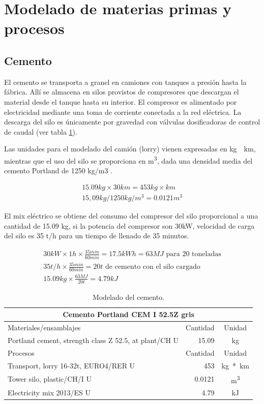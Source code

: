 \section{Modelado de materias primas y procesos}\label{sec:modeladoprocesos}
\subsection{Cemento}
El cemento se transporta a granel en camiones con tanques a presión hasta la fábrica. Allí se almacena en silos provistos de compresores que descargan el material desde el tanque hasta su interior. El compresor es alimentado por electricidad mediante una toma de corriente conectada a la red eléctrica. La descarga del silo es únicamente por gravedad con válvulas dosificadoras de control de caudal (ver tabla \ref{modeladodelcemento}).

Las unidades para el modelado del camión (lorry) vienen expresadas en \si{kg\times km}, mientras que el uso del silo se proporciona en \si{m^3}, dada una densidad media del cemento Portland de 1250 \si{kg/m3} \cite{website:ecoinvent}.

\begin{gather}
15.09 kg \times 30 km = 453 kg\times km\\
15,09 kg / 1250 kg/m^3 = 0.0121 m^3
\end{gather}

El mix eléctrico se obtiene del consumo del compresor del silo proporcional a una cantidad de 15.09 \si{kg}, si la potencia del compresor son 30kW, velocidad de carga del silo es 35 \si{\tonne/h} para un tiempo de llenado de 35 minutos.

\begin{gather}
30 kW \times 1 h \times \frac{35 min}{60 min} = 17.5 kWh = 63 MJ \text{ para 20 toneladas}\\
35 t/h \times \frac{35 min}{60 min} = 20 t \text{ de cemento con el silo cargado}\\
15.09 kg \times \frac{63 MJ}{20 t} = 4.79 kJ
\end{gather}

\begin{table}[!htb]
\centering
\begin{tabular}{p{8cm}rc}
\toprule
\multicolumn{3}{c}{Cemento Portland CEM I 52.5Z gris}\\
\midrule
Materiales/ensamblajes & Cantidad & Unidad\\
\midrule
Portland cement, strength class Z 52.5, at plant/CH U & 15.09 & \si{kg}\\
\midrule
Procesos & Cantidad & Unidad\\
\midrule
Transport, lorry 16-32t, EURO4/RER U & 453 & \si{kg*km}\\
Tower silo, plastic/CH/I U & 0.0121 & \si{m^3}\\
Electricity mix 2013/ES U & 4.79 & \si{kJ}\\
\bottomrule
\end{tabular}
\caption{Modelado del cemento.}
\label{modeladodelcemento}
\end{table}

